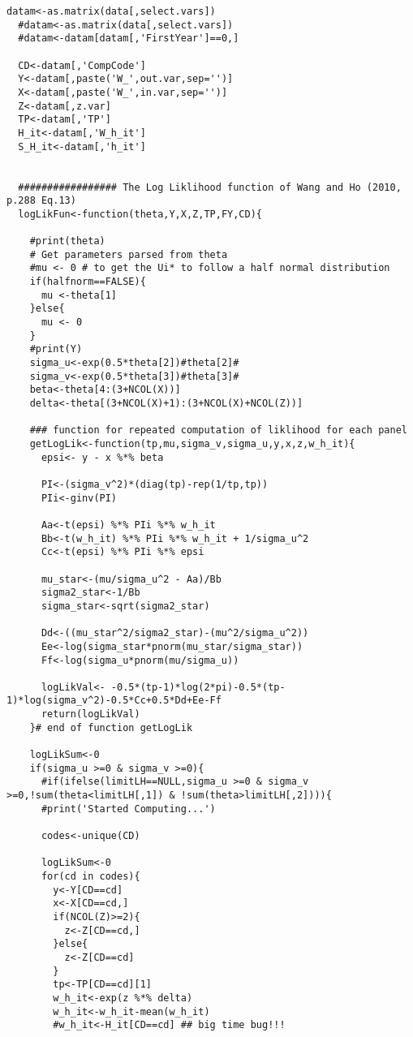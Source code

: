 \begin{lstlisting}[label=Rcode3, caption=R-Code for Numerical Estimation of Hessian Matrix]
  datam<-as.matrix(data[,select.vars])
  #datam<-as.matrix(data[,select.vars])
  #datam<-datam[datam[,'FirstYear']==0,]
  
  CD<-datam[,'CompCode']
  Y<-datam[,paste('W_',out.var,sep='')]  
  X<-datam[,paste('W_',in.var,sep='')]
  Z<-datam[,z.var]
  TP<-datam[,'TP']
  H_it<-datam[,'W_h_it']
  S_H_it<-datam[,'h_it']
  
  
  ################# The Log Liklihood function of Wang and Ho (2010, p.288 Eq.13)
  logLikFun<-function(theta,Y,X,Z,TP,FY,CD){
    
    #print(theta)
    # Get parameters parsed from theta
    #mu <- 0 # to get the Ui* to follow a half normal distribution
    if(halfnorm==FALSE){
      mu <-theta[1]  
    }else{
      mu <- 0
    }
    #print(Y)
    sigma_u<-exp(0.5*theta[2])#theta[2]#
    sigma_v<-exp(0.5*theta[3])#theta[3]#
    beta<-theta[4:(3+NCOL(X))]
    delta<-theta[(3+NCOL(X)+1):(3+NCOL(X)+NCOL(Z))]
    
    ### function for repeated computation of liklihood for each panel
    getLogLik<-function(tp,mu,sigma_v,sigma_u,y,x,z,w_h_it){      
      epsi<- y - x %*% beta    
      
      PI<-(sigma_v^2)*(diag(tp)-rep(1/tp,tp))
      PIi<-ginv(PI)      
      
      Aa<-t(epsi) %*% PIi %*% w_h_it
      Bb<-t(w_h_it) %*% PIi %*% w_h_it + 1/sigma_u^2
      Cc<-t(epsi) %*% PIi %*% epsi
      
      mu_star<-(mu/sigma_u^2 - Aa)/Bb
      sigma2_star<-1/Bb
      sigma_star<-sqrt(sigma2_star)      
      
      Dd<-((mu_star^2/sigma2_star)-(mu^2/sigma_u^2))
      Ee<-log(sigma_star*pnorm(mu_star/sigma_star))
      Ff<-log(sigma_u*pnorm(mu/sigma_u))
      
      logLikVal<- -0.5*(tp-1)*log(2*pi)-0.5*(tp-1)*log(sigma_v^2)-0.5*Cc+0.5*Dd+Ee-Ff        
      return(logLikVal)       
    }# end of function getLogLik    
    
    logLikSum<-0
    if(sigma_u >=0 & sigma_v >=0){
      #if(ifelse(limitLH==NULL,sigma_u >=0 & sigma_v >=0,!sum(theta<limitLH[,1]) & !sum(theta>limitLH[,2]))){
      #print('Started Computing...')
      
      codes<-unique(CD)
      
      logLikSum<-0        
      for(cd in codes){
        y<-Y[CD==cd]
        x<-X[CD==cd,]
        if(NCOL(Z)>=2){
          z<-Z[CD==cd,]
        }else{
          z<-Z[CD==cd]
        }
        tp<-TP[CD==cd][1]
        w_h_it<-exp(z %*% delta)
        w_h_it<-w_h_it-mean(w_h_it)
        #w_h_it<-H_it[CD==cd] ## big time bug!!!
        

\end{lstlisting}
